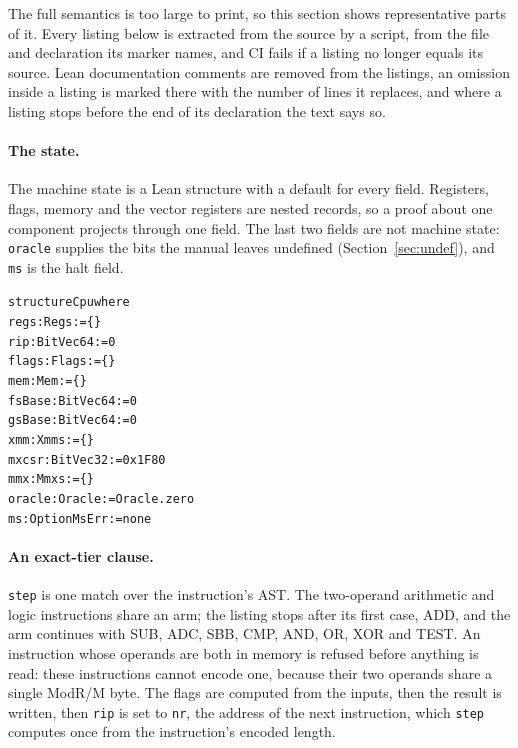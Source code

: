 \documentclass[runningheads]{llncs}
\newcommand{\src}[1]{}  %
\newcommand{\lean}[1]{\texttt{#1}}
\begin{document}
The full semantics is too large to print, so this section shows representative parts of it. Every listing
below is extracted from the source by a script, from the file and declaration its marker names, and CI
fails if a listing no longer equals its source. Lean documentation comments are removed from the listings, an omission inside a listing is marked there with the number of lines it replaces, and where a listing stops before the end of its declaration the text says so.
\src{scripts/check\_listings.py; .github/workflows/ci.yml, the listings step}

\paragraph{The state.}
The machine state is a Lean structure with a default for every field. Registers, flags, memory and the
vector registers are nested records, so a proof about one component projects through one field. The last
two fields are not machine state: \lean{oracle} supplies the bits the manual leaves undefined
(Section~\ref{sec:undef}), and \lean{ms} is the halt field.
\src{X86/State.lean structure Cpu}

{\scriptsize
\begin{alltt}
structure Cpu where
  regs : Regs := \{\}
  rip : BitVec 64 := 0
  flags : Flags := \{\}
  mem : Mem := \{\}
  fsBase : BitVec 64 := 0
  gsBase : BitVec 64 := 0
  xmm : Xmms := \{\}
  mxcsr : BitVec 32 := 0x1F80
  mmx : Mmxs := \{\}
  oracle : Oracle := Oracle.zero
  ms : Option MsErr := none
\end{alltt}
}

\paragraph{An exact-tier clause.}
\lean{step} is one match over the instruction's AST. The two-operand arithmetic and logic instructions
share an arm; the listing stops after its first case, ADD, and the arm continues with SUB, ADC, SBB, CMP,
AND, OR, XOR and TEST. An instruction whose operands are both in memory is refused before anything is
read: these instructions cannot encode one, because their two operands share a single ModR/M byte. The
flags are computed
from the inputs, then the result is written, then \lean{rip} is set to \lean{nr}, the address of the next
instruction, which \lean{step} computes once from the instruction's encoded length.
\src{X86/Semantics.lean step, the .bin arm; wellFormed2 is !(dst.isMem \&\& src.isMem), citing SDM Vol. 2A 2.1.5}
\end{document}
